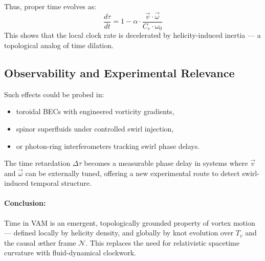 Thus, proper time evolves as:
\[
    \boxed{
    \frac{d\tau}{dt} = 1 - \alpha \cdot \frac{\vec{v} \cdot \vec{\omega}}{C_e \cdot \omega_0}
    }
\]
This shows that the local clock rate is decelerated by helicity-induced inertia — a topological analog of time dilation.

\subsection*{Observability and Experimental Relevance}

Such effects could be probed in:
\begin{itemize}
  \item toroidal BECs with engineered vorticity gradients,
  \item spinor superfluids under controlled swirl injection,
  \item or photon-ring interferometers tracking swirl phase delays.
\end{itemize}

The time retardation \( \Delta \tau \) becomes a measurable phase delay in systems where \( \vec{v} \) and \( \vec{\omega} \) can be externally tuned, offering a new experimental route to detect swirl-induced temporal structure.

\paragraph{Conclusion:} Time in VAM is an emergent, topologically grounded property of vortex motion — defined locally by helicity density, and globally by knot evolution over \( T_v \) and the causal æther frame \( \mathcal{N} \). This replaces the need for relativistic spacetime curvature with fluid-dynamical clockwork.
